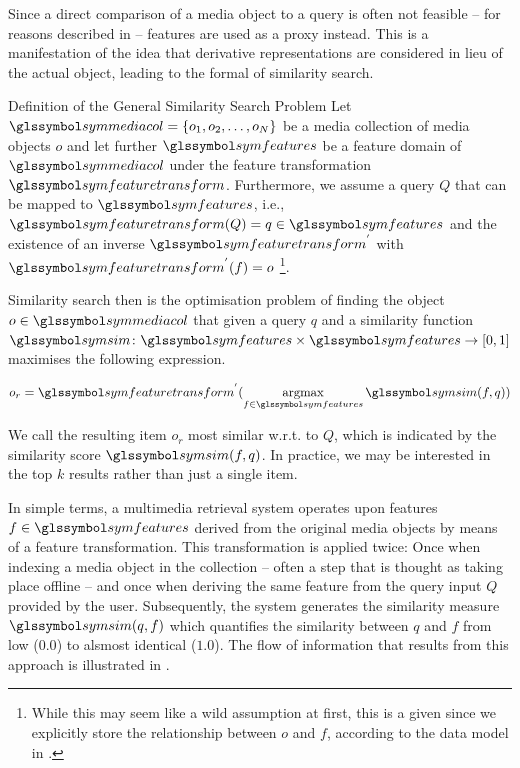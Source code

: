 Since a direct comparison of a media object to a query is often not feasible -- for reasons described in  -- features are used as a proxy instead. This is a manifestation of the idea that derivative representations are considered in lieu of the actual object, leading to the formal  of similarity search.

\begin{definition}[label=definition:similarity_search]{Definition of the General Similarity Search Problem}{}
    Let $\symmediacol = \lbrace o_1, o_2, \ldots, o_N \rbrace$ be a media collection of media objects $o$ and let further $\symfeatures$ be a feature domain of $\symmediacol$ under the feature transformation $\symfeaturetransform$. Furthermore, we assume a query $Q$ that can be mapped to $\symfeatures$, i.e., $\symfeaturetransform(Q) = q \in \symfeatures$ and the existence of an inverse $\symfeaturetransform^{'}$ with $\symfeaturetransform^{'}(f) = o$ \footnote{While this may seem like a wild assumption at first, this is a given since we explicitly store the relationship between $o$ and $f$, according to the data model in .}.

    Similarity search then is the optimisation problem of finding the object $o \in \symmediacol$ that given a query $q$ and a similarity function $\symsim \colon \symfeatures \times \symfeatures \rightarrow [0, 1]$ maximises the following expression.

    \begin{equation}
       o_r =  \symfeaturetransform^{'} (\argmax_{f \in \symfeatures} \symsim(f,q))
    \end{equation}
 
    We call the resulting item $o_r$ most similar w.r.t. to $Q$, which is indicated by the similarity score $\symsim(f,q)$. In practice, we may be interested in the top $k$ results rather than just a single item.
\end{definition}

In simple terms, a multimedia retrieval system operates upon features $f \in \symfeatures$ derived from the original media objects by means of a feature transformation. This transformation is applied twice: Once when indexing a media object in the collection -- often a step that is thought as taking place offline -- and once when deriving the same feature from the query input $Q$ provided by the user. Subsequently, the system generates the similarity measure $\symsim(q,f)$ which quantifies the similarity between $q$ and $f$ from low ($0.0$) to alsmost identical ($1.0$). The flow of information that results from this approach is illustrated in . 

